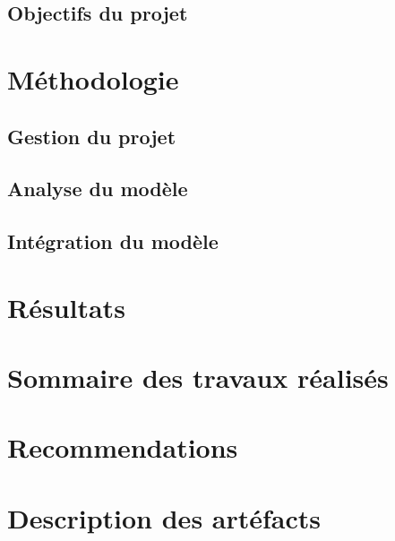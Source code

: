 \documentclass[11pt]{article}
\begin{document}
\subsection{Objectifs du projet} %
\label{sub:Objectifs}


\section{Méthodologie} %
\label{sec:Méthodologie}

\subsection{Gestion du projet} %
\label{sub:Gestion du projet}

\subsection{Analyse du modèle} %
\label{sub:Analyse du modèle}

\subsection{Intégration du modèle} %
\label{sub:Intégration du modèle}


\section{Résultats} %
\label{sec:resultats}

\section{Sommaire des travaux réalisés} %
\label{sec:Sommaire des travaux réalisés}

\section{Recommendations} %
\label{sec:Recommendations}

\section{Description des artéfacts} %
\label{sec:Description des artéfacts}
\end{document}
